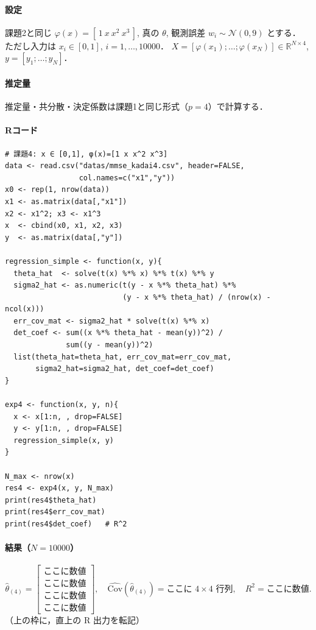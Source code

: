 \paragraph{設定}
課題2と同じ $\varphi(x)=[\,1\ x\ x^2\ x^3\,]$, 真の $\theta$, 観測誤差 $w_i\sim\mathcal{N}(0,9)$ とする．
ただし入力は $x_i\in[0,1]$, $i=1,\dots,10000$．
$X=[\varphi(x_1);\dots;\varphi(x_N)]\in\mathbb{R}^{N\times4}$, $y=[y_1;\dots;y_N]$．

\paragraph{推定量}
推定量・共分散・決定係数は課題1と同じ形式（$p=4$）で計算する．

\paragraph{Rコード}
\begin{verbatim}
# 課題4: x ∈ [0,1], φ(x)=[1 x x^2 x^3]
data <- read.csv("datas/mmse_kadai4.csv", header=FALSE,
                 col.names=c("x1","y"))
x0 <- rep(1, nrow(data))
x1 <- as.matrix(data[,"x1"])
x2 <- x1^2; x3 <- x1^3
x  <- cbind(x0, x1, x2, x3)
y  <- as.matrix(data[,"y"])

regression_simple <- function(x, y){
  theta_hat  <- solve(t(x) %*% x) %*% t(x) %*% y
  sigma2_hat <- as.numeric(t(y - x %*% theta_hat) %*%
                           (y - x %*% theta_hat) / (nrow(x) - ncol(x)))
  err_cov_mat <- sigma2_hat * solve(t(x) %*% x)
  det_coef <- sum((x %*% theta_hat - mean(y))^2) /
              sum((y - mean(y))^2)
  list(theta_hat=theta_hat, err_cov_mat=err_cov_mat,
       sigma2_hat=sigma2_hat, det_coef=det_coef)
}

exp4 <- function(x, y, n){
  x <- x[1:n, , drop=FALSE]
  y <- y[1:n, , drop=FALSE]
  regression_simple(x, y)
}

N_max <- nrow(x)
res4 <- exp4(x, y, N_max)
print(res4$theta_hat)
print(res4$err_cov_mat)
print(res4$det_coef)   # R^2
\end{verbatim}

\paragraph{結果（$N=10000$）}
\[
\hat\theta_{(4)}=
\begin{bmatrix}
\boxed{\text{ここに数値}}\\
\boxed{\text{ここに数値}}\\
\boxed{\text{ここに数値}}\\
\boxed{\text{ここに数値}}
\end{bmatrix},\quad
\widehat{\mathrm{Cov}}(\hat\theta_{(4)})=\boxed{\text{ここに $4\times4$ 行列}},\quad
R^2=\boxed{\text{ここに数値}}.
\]
（上の枠に，直上の R 出力を転記）

